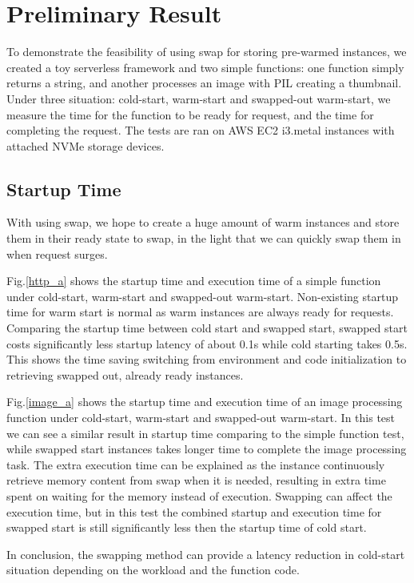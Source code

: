 \documentclass[conference]{IEEEtran}
\begin{document}
\section{Preliminary Result}

To demonstrate the feasibility of using swap for storing pre-warmed instances, we created a toy serverless framework and two simple functions: one function simply returns a string, and another processes an image with PIL creating a thumbnail. Under three situation: cold-start, warm-start and swapped-out warm-start, we measure the time for the function to be ready for request, and the time for completing the request. The tests are ran on AWS EC2 i3.metal instances with attached NVMe storage devices.

\subsection{Startup Time}
With using swap, we hope to create a huge amount of warm instances and store them in their ready state to swap, in the light that we can quickly swap them in when request surges.

Fig.\ref{http_a} shows the startup time and execution time of a simple function under cold-start, warm-start and swapped-out warm-start. Non-existing startup time for warm start is normal as warm instances are always ready for requests. Comparing the startup time between cold start and swapped start, swapped start costs significantly less startup latency of about 0.1s while cold starting takes 0.5s. This shows the time saving switching from environment and code initialization to retrieving swapped out, already ready instances.

Fig.\ref{image_a} shows the startup time and execution time of an image processing function under cold-start, warm-start and swapped-out warm-start. In this test we can see a similar result in startup time comparing to the simple function test, while swapped start instances takes longer time to complete the image processing task. The extra execution time can be explained as the instance continuously retrieve memory content from swap when it is needed, resulting in extra time spent on waiting for the memory instead of execution. Swapping can affect the execution time, but in this test the combined startup and execution time for swapped start is still significantly less then the startup time of cold start.

In conclusion, the swapping method can provide a latency reduction in cold-start situation depending on the workload and the function code.
\end{document}
